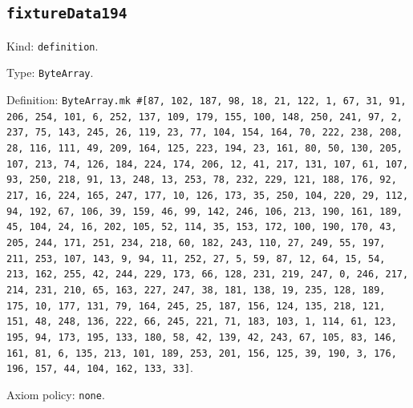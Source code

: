 \documentclass[11pt]{article}
\begin{document}
\subsection*{\texttt{fixtureData194}}
\noindent Kind: \texttt{definition}.\par
\noindent Type: \texttt{ByteArray}.\par
\noindent Definition: \texttt{ByteArray.mk \#[87, 102, 187, 98, 18, 21, 122, 1, 67, 31, 91, 206, 254, 101, 6, 252, 137, 109, 179, 155, 100, 148, 250, 241, 97, 2, 237, 75, 143, 245, 26, 119, 23, 77, 104, 154, 164, 70, 222, 238, 208, 28, 116, 111, 49, 209, 164, 125, 223, 194, 23, 161, 80, 50, 130, 205, 107, 213, 74, 126, 184, 224, 174, 206, 12, 41, 217, 131, 107, 61, 107, 93, 250, 218, 91, 13, 248, 13, 253, 78, 232, 229, 121, 188, 176, 92, 217, 16, 224, 165, 247, 177, 10, 126, 173, 35, 250, 104, 220, 29, 112, 94, 192, 67, 106, 39, 159, 46, 99, 142, 246, 106, 213, 190, 161, 189, 45, 104, 24, 16, 202, 105, 52, 114, 35, 153, 172, 100, 190, 170, 43, 205, 244, 171, 251, 234, 218, 60, 182, 243, 110, 27, 249, 55, 197, 211, 253, 107, 143, 9, 94, 11, 252, 27, 5, 59, 87, 12, 64, 15, 54, 213, 162, 255, 42, 244, 229, 173, 66, 128, 231, 219, 247, 0, 246, 217, 214, 231, 210, 65, 163, 227, 247, 38, 181, 138, 19, 235, 128, 189, 175, 10, 177, 131, 79, 164, 245, 25, 187, 156, 124, 135, 218, 121, 151, 48, 248, 136, 222, 66, 245, 221, 71, 183, 103, 1, 114, 61, 123, 195, 94, 173, 195, 133, 180, 58, 42, 139, 42, 243, 67, 105, 83, 146, 161, 81, 6, 135, 213, 101, 189, 253, 201, 156, 125, 39, 190, 3, 176, 196, 157, 44, 104, 162, 133, 33]}.\par
\noindent Axiom policy: \texttt{none}.\par
\end{document}

